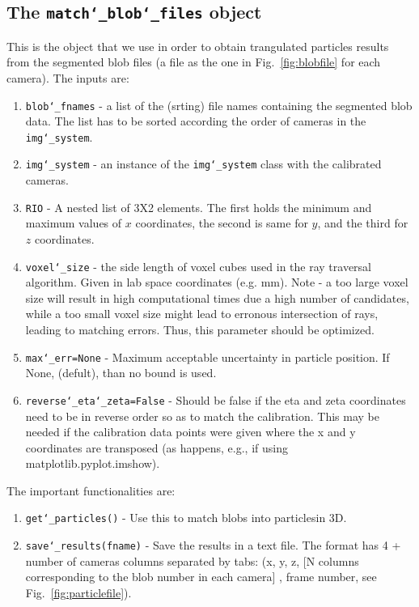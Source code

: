 \documentclass[10pt,a4paper]{article}
\begin{document}
\subsection{The \texttt{match\char`_blob\char`_files} object}


This is the object that we use in order to obtain trangulated particles results from the segmented blob files (a file as the one in Fig.~\ref{fig:blobfile} for each camera). The inputs are:
%
\begin{enumerate}
	\item \texttt{blob\char`_fnames} - a list of the (srting) file names containing the segmented blob data. The list has to be sorted according the order of cameras in the \texttt{img\char`_system}.
	
	\item \texttt{img\char`_system} - an instance of the \texttt{img\char`_system} class with the calibrated cameras.
	
	\item \texttt{RIO} - A nested list of 3X2 elements. The first holds the minimum and  maximum values of $x$ coordinates, the second is same for $y$, and  the third for $z$ coordinates. 
	
	\item \texttt{voxel\char`_size} - the side length of voxel cubes used in the ray traversal algorithm. Given in lab space coordinates (e.g. mm). Note - a too large voxel size will result in high computational times due a high number of candidates, while a too small voxel size might lead to erronous intersection of rays, leading to matching errors. Thus, this parameter should be optimized.
	
	\item \texttt{max\char`_err=None} - Maximum acceptable uncertainty in particle position. If None, (defult), than no bound is used.
	
	\item \texttt{reverse\char`_eta\char`_zeta=False} - Should be false if the eta and zeta coordinates need to be in reverse order so as to match the calibration. This may be needed if the calibration data points were given where the x and y coordinates are transposed (as happens, e.g., if using matplotlib.pyplot.imshow).
\end{enumerate}


The important functionalities are:
%
\begin{enumerate}
	\item \texttt{get\char`_particles()} - Use this to match blobs into particlesin 3D.
	\item \texttt{save\char`_results(fname)} - Save the results in a text file. The format has 4 + number of cameras columns separated by tabs:
	(x, y, z, [N columns corresponding to the blob number in each camera] , frame number, see Fig.~\ref{fig:particlefile}).
\end{enumerate}
\end{document}

